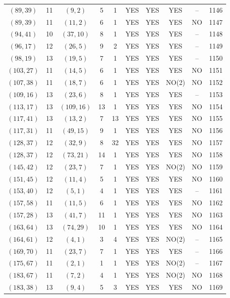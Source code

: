 \begin{longtable}{|c|c|c|c|c|c|c|c|c|c|}
$(89, 39)$ & 11 & $(9, 2)$ & 5 & 1 & YES & YES & YES & -- & 1146\\
$(89, 39)$ & 11 & $(11, 2)$ & 6 & 1 & YES & YES & YES & NO & 1147\\
$(94, 41)$ & 10 & $(37, 10)$ & 8 & 1 & YES & YES & YES & -- & 1148\\
$(96, 17)$ & 12 & $(26, 5)$ & 9 & 2 & YES & YES & YES & -- & 1149\\
$(98, 19)$ & 13 & $(19, 5)$ & 7 & 1 & YES & YES & YES & -- & 1150\\
$(103, 27)$ & 11 & $(14, 5)$ & 6 & 1 & YES & YES & YES & NO & 1151\\
$(107, 38)$ & 11 & $(18, 7)$ & 6 & 1 & YES & YES & NO(2) & NO & 1152\\
$(109, 16)$ & 13 & $(23, 6)$ & 8 & 1 & YES & YES & YES & -- & 1153\\
$(113, 17)$ & 13 & $(109, 16)$ & 13 & 1 & YES & YES & YES & NO & 1154\\
$(117, 41)$ & 13 & $(13, 2)$ & 7 & 13 & YES & YES & YES & NO & 1155\\
$(117, 31)$ & 11 & $(49, 15)$ & 9 & 1 & YES & YES & YES & NO & 1156\\
$(128, 37)$ & 12 & $(32, 9)$ & 8 & 32 & YES & YES & YES & NO & 1157\\
$(128, 37)$ & 12 & $(73, 21)$ & 14 & 1 & YES & YES & YES & NO & 1158\\
$(145, 42)$ & 12 & $(23, 7)$ & 7 & 1 & YES & YES & NO(2) & NO & 1159\\
$(151, 45)$ & 12 & $(11, 4)$ & 5 & 1 & YES & YES & YES & NO & 1160\\
$(153, 40)$ & 12 & $(5, 1)$ & 4 & 1 & YES & YES & YES & -- & 1161\\
$(157, 58)$ & 11 & $(11, 5)$ & 6 & 1 & YES & YES & YES & NO & 1162\\
$(157, 28)$ & 13 & $(41, 7)$ & 11 & 1 & YES & YES & YES & NO & 1163\\
$(163, 64)$ & 13 & $(74, 29)$ & 10 & 1 & YES & YES & YES & NO & 1164\\
$(164, 61)$ & 12 & $(4, 1)$ & 3 & 4 & YES & YES & NO(2) & -- & 1165\\
$(169, 70)$ & 11 & $(23, 7)$ & 7 & 1 & YES & YES & YES & -- & 1166\\
$(175, 67)$ & 11 & $(2, 1)$ & 1 & 1 & YES & YES & NO(2) & -- & 1167\\
$(183, 67)$ & 11 & $(7, 2)$ & 4 & 1 & YES & YES & NO(2) & NO & 1168\\
$(183, 38)$ & 13 & $(9, 4)$ & 5 & 3 & YES & YES & YES & NO & 1169\\

\end{longtable}
